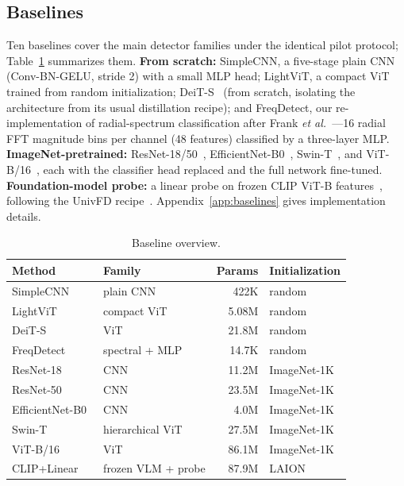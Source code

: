 \documentclass[journal]{IEEEtran}
\begin{document}
\subsection{Baselines}
\label{sec:baselines}
Ten baselines cover the main detector families under the identical pilot protocol; Table~\ref{tab:baseline_overview} summarizes them. \textbf{From scratch:} SimpleCNN, a five-stage plain CNN (Conv-BN-GELU, stride 2) with a small MLP head; LightViT, a compact ViT trained from random initialization; DeiT-S~\cite{touvron2021} (from scratch, isolating the architecture from its usual distillation recipe); and FreqDetect, our re-implementation of radial-spectrum classification after Frank \textit{et al.}~\cite{frank2020}---16 radial FFT magnitude bins per channel (48 features) classified by a three-layer MLP. \textbf{ImageNet-pretrained:} ResNet-18/50~\cite{he2016}, EfficientNet-B0~\cite{tan2019}, Swin-T~\cite{liu2021}, and ViT-B/16~\cite{dosovitskiy2021}, each with the classifier head replaced and the full network fine-tuned. \textbf{Foundation-model probe:} a linear probe on frozen CLIP ViT-B features~\cite{radford2021}, following the UnivFD recipe~\cite{ojha2023}. Appendix~\ref{app:baselines} gives implementation details.

\begin{table}[!t]
\renewcommand{\arraystretch}{1.2}
\caption{Baseline overview.}
\label{tab:baseline_overview}
\centering
\setlength{\tabcolsep}{4pt}
\begin{tabular}{llrl}
\toprule
Method & Family & Params & Initialization \\
\midrule
SimpleCNN   & plain CNN        & 422K   & random \\
LightViT    & compact ViT      & 5.08M  & random \\
DeiT-S~\cite{touvron2021} & ViT & 21.8M & random \\
FreqDetect~\cite{frank2020} & spectral + MLP & 14.7K & random \\
ResNet-18~\cite{he2016}   & CNN & 11.2M & ImageNet-1K \\
ResNet-50~\cite{he2016}   & CNN & 23.5M & ImageNet-1K \\
EfficientNet-B0~\cite{tan2019} & CNN & 4.0M & ImageNet-1K \\
Swin-T~\cite{liu2021}     & hierarchical ViT & 27.5M & ImageNet-1K \\
ViT-B/16~\cite{dosovitskiy2021} & ViT & 86.1M & ImageNet-1K \\
CLIP+Linear~\cite{radford2021,ojha2023} & frozen VLM + probe & 87.9M & LAION \\
\bottomrule
\end{tabular}
\end{table}
\end{document}
